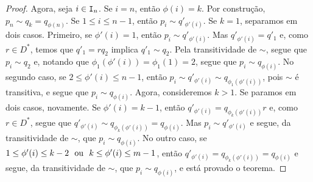 \begin{proof}
	Agora, seja $i \in \mathtt I_n$. Se $i=n$, então $\phi(i)=k$. Por construção, $p_n \sim q_k = q_{\phi(n)}$. Se $1 \leq i \leq n-1$, então $p_i \sim q'_{\phi'(i)}$. Se $k=1$, separamos em dois casos. Primeiro, se $\phi'(i)=1$, então $p_i \sim q'_{\phi'(i)}$. Mas $q'_{\phi'(i)}=q'_1$ e, como $r \in D^*$, temos que $q'_1 = rq_2$ implica $q'_1 \sim q_2$. Pela transitividade de $\sim$, segue que $p_i \sim q_2$ e, notando que $\phi_1(\phi'(i))=\phi_1(1)=2$, segue que $p_i \sim q_{\phi(i)}$. No segundo caso, se $2 \leq \phi'(i) \leq n-1$, então $p_i \sim q'_{\phi'(i)} \sim q_{\phi_1(\phi'(i))}$, pois $\sim$ é transitiva, e segue que $p_i \sim q_{\phi(i)}$. Agora, consideremos $k>1$. Se paramos em dois casos, novamente. Se $\phi'(i) = k-1$, então $q'_{\phi'(i)} = q_{\phi_k(\phi'(i))}r$ e, como $r \in D^*$, segue que $q'_{\phi'(i)} \sim q_{\phi_k(\phi'(i))}=q_{\phi(i)}$. Mas $p_i \sim q'_{\phi'(i)}$ e segue, da transitividade de $\sim$, que $p_i \sim q_{\phi(i)}$. No outro caso, se $1 \leq \phi'(i) \leq k-2 \text{\ \ ou\ \ } k \leq \phi'(i) \leq m-1$, então $q'_{\phi'(i)} = q_{\phi_k(\phi'(i))}=q_{\phi(i)}$ e segue, da transitividade de $\sim$, que $p_i \sim q_{\phi(i)}$, e está provado o teorema.
\end{proof}

